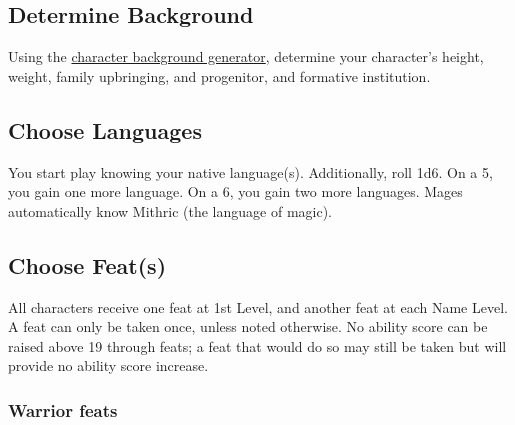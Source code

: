 \documentclass{book}
\begin{document}
\subsection*{Determine Background}\label{determine-background}

Using the \href{background.md}{character background generator},
determine your character's height, weight, family upbringing, and
progenitor, and formative institution.

\subsection*{Choose Languages}\label{choose-languages}

You start play knowing your native language(s). Additionally, roll 1d6.
On a 5, you gain one more language. On a 6, you gain two more languages.
Mages automatically know Mithric (the language of magic).

\subsection*{Choose Feat(s)}\label{choose-feats}

All characters receive one feat at 1st Level, and another feat at each
Name Level. A feat can only be taken once, unless noted otherwise. No
ability score can be raised above 19 through feats; a feat that would do
so may still be taken but will provide no ability score increase.

\subsubsection*{Warrior feats}\label{warrior-feats}
\end{document}
